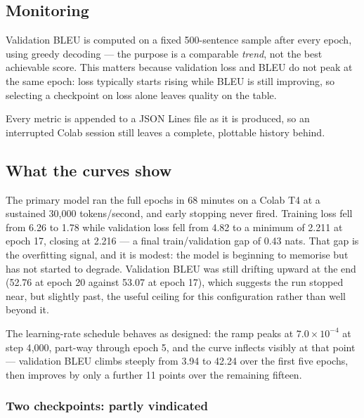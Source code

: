 \documentclass[11pt,a4paper]{article}
\begin{document}
\subsection{Monitoring}

Validation BLEU is computed on a fixed 500-sentence sample after every epoch,
using greedy decoding --- the purpose is a comparable \emph{trend}, not the best
achievable score. This matters because validation loss and BLEU do not peak at
the same epoch: loss typically starts rising while BLEU is still improving, so
selecting a checkpoint on loss alone leaves quality on the table.

Every metric is appended to a JSON Lines file as it is produced, so an
interrupted Colab session still leaves a complete, plottable history behind.


\subsection{What the curves show}

The primary model ran the full \EpochsBpeScratch{} epochs in 68 minutes on a
Colab T4 at a sustained 30{,}000 tokens/second, and early stopping never fired.
Training loss fell from 6.26 to 1.78 while validation loss fell from 4.82 to a
minimum of 2.211 at epoch 17, closing at 2.216 --- a final train/validation gap
of 0.43 nats. That gap is the overfitting signal, and it is modest: the model is
beginning to memorise but has not started to degrade. Validation BLEU was still
drifting upward at the end (52.76 at epoch 20 against 53.07 at epoch 17), which
suggests the run stopped near, but slightly past, the useful ceiling for this
configuration rather than well beyond it.

The learning-rate schedule behaves as designed: the ramp peaks at
$7.0\times10^{-4}$ at step 4{,}000, part-way through epoch 5, and the curve
inflects visibly at that point --- validation BLEU climbs steeply from 3.94 to
42.24 over the first five epochs, then improves by only a further 11 points over
the remaining fifteen.

\subsubsection*{Two checkpoints: partly vindicated}
\end{document}
